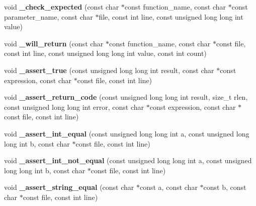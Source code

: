 \begin{DoxyCompactItemize}
\item 
\mbox{\label{group__cmocka_ga3ea17ca6f67820123704050e4d4d41b4}} 
void {\bfseries \+\_\+check\+\_\+expected} (const char $\ast$const function\+\_\+name, const char $\ast$const parameter\+\_\+name, const char $\ast$file, const int line, const unsigned long long int value)
\item 
\mbox{\label{group__cmocka_gaa934762a305850a7336ac0f2dd8dc9a3}} 
void {\bfseries \+\_\+will\+\_\+return} (const char $\ast$const function\+\_\+name, const char $\ast$const file, const int line, const unsigned long long int value, const int count)
\item 
\mbox{\label{group__cmocka_ga53267b1e844276c4dad5d8a268c22ce7}} 
void {\bfseries \+\_\+assert\+\_\+true} (const unsigned long long int result, const char $\ast$const expression, const char $\ast$const file, const int line)
\item 
\mbox{\label{group__cmocka_ga19a35f45ed17fa9372680417877c73e4}} 
void {\bfseries \+\_\+assert\+\_\+return\+\_\+code} (const unsigned long long int result, size\+\_\+t rlen, const unsigned long long int error, const char $\ast$const expression, const char $\ast$const file, const int line)
\item 
\mbox{\label{group__cmocka_ga9e56b6c61a5146bed83a7a125b021def}} 
void {\bfseries \+\_\+assert\+\_\+int\+\_\+equal} (const unsigned long long int a, const unsigned long long int b, const char $\ast$const file, const int line)
\item 
\mbox{\label{group__cmocka_gad3aaec1069aa9352432e06d09e8061a0}} 
void {\bfseries \+\_\+assert\+\_\+int\+\_\+not\+\_\+equal} (const unsigned long long int a, const unsigned long long int b, const char $\ast$const file, const int line)
\item 
\mbox{\label{group__cmocka_ga5e0c6c1751e286b09869c26369d1e39d}} 
void {\bfseries \+\_\+assert\+\_\+string\+\_\+equal} (const char $\ast$const a, const char $\ast$const b, const char $\ast$const file, const int line)
\item 
\mbox{\label{group__cmocka_ga79c04cd7ebcd344e75a2a76a1a6a54d2}} 

\end{DoxyCompactItemize}
